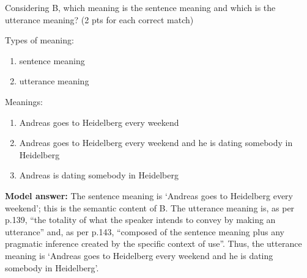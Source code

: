 \documentclass[a4,11pt]{article}
\newcommand{\6}{\mbox{$[\hspace*{-.6mm}[$}}
\newcommand{\9}{\mbox{$]\hspace*{-.6mm}]$}}
\begin{document}
\begin{enumerate}[leftmargin = 12pt]
Considering B, which meaning is the sentence meaning and which is the utterance meaning? (2 pts for each correct match)

Types of meaning:

\begin{enumerate}[noitemsep]
\item sentence meaning
\item utterance meaning
\end{enumerate}

Meanings:

\begin{enumerate}[noitemsep]
\item Andreas goes to Heidelberg every weekend
\item Andreas goes to Heidelberg every weekend and he is dating somebody in Heidelberg
\item Andreas is dating somebody in Heidelberg
\end{enumerate}

{\bf Model answer:} The sentence meaning is `Andreas goes to Heidelberg every weekend'; this is the semantic content of B. The utterance meaning is, as per p.139, ``the totality of what the speaker intends to convey by making an utterance'' and, as per p.143, ``composed of the sentence meaning plus any pragmatic inference created by the specific context of use''. Thus, the utterance meaning is `Andreas goes to Heidelberg every weekend and he is dating somebody in Heidelberg'.

\end{enumerate}
\end{document}
